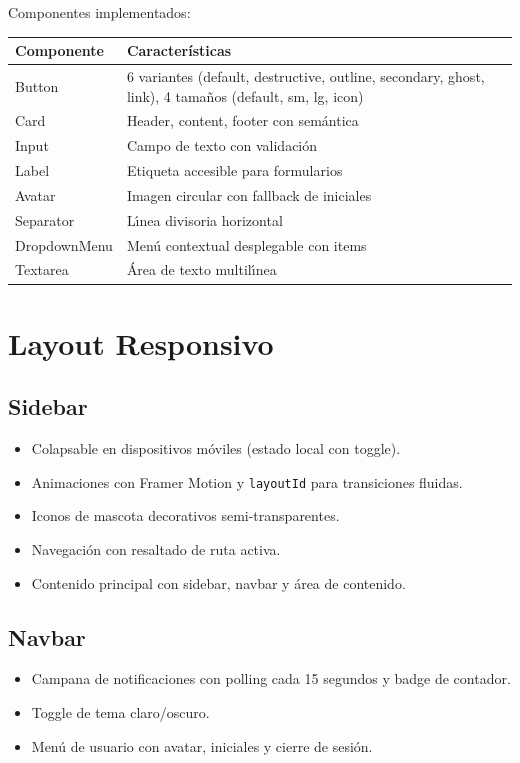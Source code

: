 Componentes implementados:

\begin{longtable}{|l|l|}
\hline
\textbf{Componente} & \textbf{Caracter\'isticas} \\
\hline
Button & 6 variantes (default, destructive, outline, secondary,
         ghost, link), 4 tama\~nos (default, sm, lg, icon) \\
Card & Header, content, footer con sem\'antica \\
Input & Campo de texto con validaci\'on \\
Label & Etiqueta accesible para formularios \\
Avatar & Imagen circular con fallback de iniciales \\
Separator & L\'{\i}nea divisoria horizontal \\
DropdownMenu & Men\'u contextual desplegable con items \\
Textarea & \'Area de texto multil\'{\i}nea \\
\hline
\end{longtable}

\section{Layout Responsivo}

\subsection{Sidebar}

\begin{itemize}[leftmargin=*]
    \item Colapsable en dispositivos m\'oviles (estado local con toggle).
    \item Animaciones con Framer Motion y \texttt{layoutId} para
          transiciones fluidas.
    \item Iconos de mascota decorativos semi-transparentes.
    \item Navegaci\'on con resaltado de ruta activa.
    \item Contenido principal con sidebar, navbar y \'area de contenido.
\end{itemize}

\subsection{Navbar}

\begin{itemize}[leftmargin=*]
    \item Campana de notificaciones con polling cada 15 segundos y
          badge de contador.
    \item Toggle de tema claro/oscuro.
    \item Men\'u de usuario con avatar, iniciales y cierre de sesi\'on.
\end{itemize}

